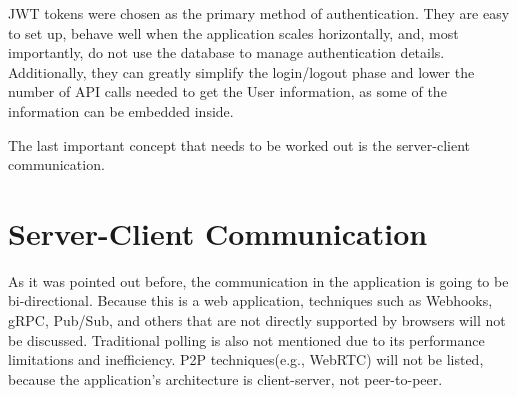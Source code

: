 JWT tokens were chosen as the primary method of authentication. They are easy to set up, behave well when the
application scales horizontally, and, most importantly, do not use the database to manage authentication details.
Additionally, they can greatly simplify the login/logout phase and lower the number of API calls needed to get the
User information, as some of the information can be embedded inside.

The last important concept that needs to be worked out is the server-client communication.


\section{Server-Client Communication}
As it was pointed out before, the communication in the application is going to be bi-directional.
Because this is a web application, techniques such as Webhooks, gRPC, Pub/Sub, and others that are not directly supported by browsers will not be discussed. Traditional polling is also not mentioned due
to its performance limitations and inefficiency. P2P techniques(e.g., WebRTC) will not be listed,
because the application's architecture is client-server, not peer-to-peer.

